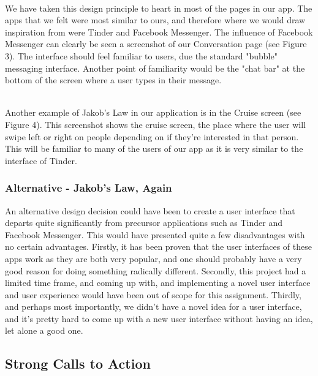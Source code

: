 \documentclass[a4paper, 11pt]{article}
\begin{document}
~\\
We have taken this design principle to heart in most of the pages in our app. The apps that we felt were most similar to ours, and therefore where we would draw inspiration from were Tinder and Facebook Messenger. The influence of Facebook Messenger can clearly be seen a screenshot of our Conversation page (see Figure 3). The interface should feel familiar to users, due the standard "bubble" messaging interface. Another point of familiarity would be the "chat bar" at the bottom of the screen where a user types in their message.

~\\
Another example of Jakob's Law in our application is in the Cruise screen (see Figure 4). This screenshot shows the cruise screen, the place where the user will swipe left or right on people depending on if they're interested in that person. This will be familiar to many of the users of our app as it is very similar to the interface of Tinder.

\subsubsection{Alternative - Jakob's Law, Again}
An alternative design decision could have been to create a user interface that departs quite significantly from precursor applications such as Tinder and Facebook Messenger. This would have presented quite a few disadvantages with no certain advantages. Firstly, it has been proven that the user interfaces of these apps work as they are both very popular, and one should probably have a very good reason for doing something radically different. Secondly, this project had a limited time frame, and coming up with, and implementing a novel user interface and user experience would have been out of scope for this assignment. Thirdly, and perhaps most importantly, we didn't have a novel idea for a user interface, and it's pretty hard to come up with a new user interface without having an idea, let alone a good one.

\subsection{Strong Calls to Action}
\end{document}
